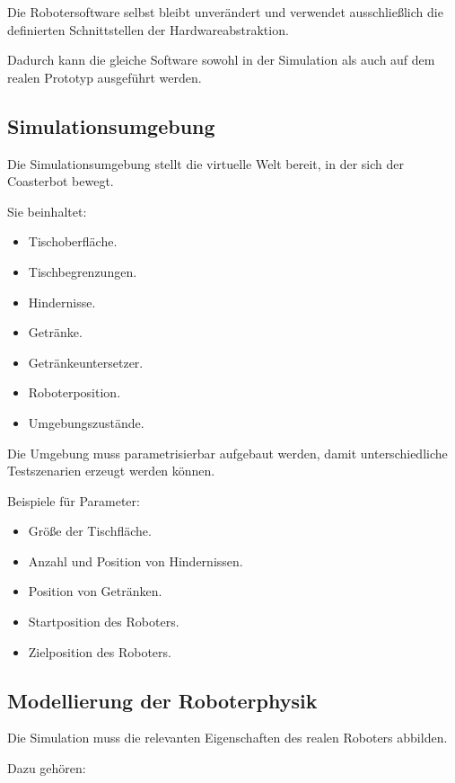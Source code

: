 \documentclass[
  a4paper,
  12pt,
  DIV=12,        %
  parskip=half,  %
  headings=small %
]{scrartcl}
\theoremstyle{definition}
\providecommand{\tightlist}{%
  \setlength{\itemsep}{0pt}\setlength{\parskip}{0pt}}
\theoremstyle{definition}
\begin{document}
Die Robotersoftware selbst bleibt unverändert und verwendet
ausschließlich die definierten Schnittstellen der Hardwareabstraktion.

Dadurch kann die gleiche Software sowohl in der Simulation als auch auf
dem realen Prototyp ausgeführt werden.

\subsection{Simulationsumgebung}\label{simulationsumgebung}

Die Simulationsumgebung stellt die virtuelle Welt bereit, in der sich
der Coasterbot bewegt.

Sie beinhaltet:

\begin{itemize}
\tightlist
\item
  Tischoberfläche.
\item
  Tischbegrenzungen.
\item
  Hindernisse.
\item
  Getränke.
\item
  Getränkeuntersetzer.
\item
  Roboterposition.
\item
  Umgebungszustände.
\end{itemize}

Die Umgebung muss parametrisierbar aufgebaut werden, damit
unterschiedliche Testszenarien erzeugt werden können.

Beispiele für Parameter:

\begin{itemize}
\tightlist
\item
  Größe der Tischfläche.
\item
  Anzahl und Position von Hindernissen.
\item
  Position von Getränken.
\item
  Startposition des Roboters.
\item
  Zielposition des Roboters.
\end{itemize}

\subsection{Modellierung der
Roboterphysik}\label{modellierung-der-roboterphysik}

Die Simulation muss die relevanten Eigenschaften des realen Roboters
abbilden.

Dazu gehören:
\end{document}
